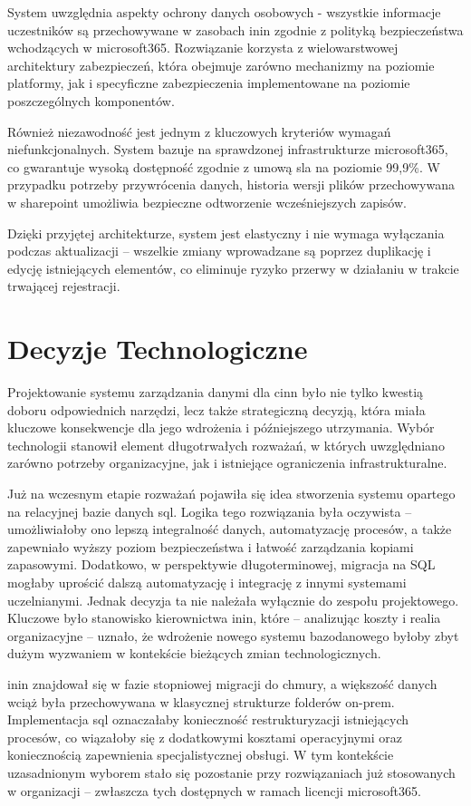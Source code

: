 System uwzględnia aspekty ochrony danych osobowych - wszystkie informacje uczestników są przechowywane w zasobach \gls{inin} zgodnie z polityką bezpieczeństwa wchodzących w \gls{microsoft365}. Rozwiązanie korzysta z wielowarstwowej architektury zabezpieczeń, która obejmuje zarówno mechanizmy na poziomie platformy, jak i specyficzne zabezpieczenia implementowane na poziomie poszczególnych komponentów. 

Również niezawodność jest jednym z kluczowych kryteriów wymagań niefunkcjonalnych. System bazuje na sprawdzonej infrastrukturze \gls{microsoft365}, co gwarantuje wysoką dostępność zgodnie z umową \gls{sla} na poziomie 99,9\%. W przypadku potrzeby przywrócenia danych, historia wersji plików przechowywana w \gls{sharepoint} umożliwia bezpieczne odtworzenie wcześniejszych zapisów. 

Dzięki przyjętej architekturze, system jest elastyczny i nie wymaga wyłączania podczas aktualizacji – wszelkie zmiany wprowadzane są poprzez duplikację i edycję istniejących elementów, co eliminuje ryzyko przerwy w działaniu w trakcie trwającej rejestracji. 

\section{Decyzje Technologiczne}
Projektowanie systemu zarządzania danymi dla \gls{cinn} było nie tylko kwestią doboru odpowiednich narzędzi, lecz także strategiczną decyzją, która miała kluczowe konsekwencje dla jego wdrożenia i późniejszego utrzymania. Wybór technologii stanowił element długotrwałych rozważań, w których uwzględniano zarówno potrzeby organizacyjne, jak i istniejące ograniczenia infrastrukturalne.

Już na wczesnym etapie rozważań pojawiła się idea stworzenia systemu opartego na relacyjnej bazie danych \gls{sql}. Logika tego rozwiązania była oczywista – umożliwiałoby ono lepszą integralność danych, automatyzację procesów, a także zapewniało wyższy poziom bezpieczeństwa i łatwość zarządzania kopiami zapasowymi. Dodatkowo, w perspektywie długoterminowej, migracja na SQL mogłaby uprościć dalszą automatyzację i integrację z innymi systemami uczelnianymi. Jednak decyzja ta nie należała wyłącznie do zespołu projektowego. Kluczowe było stanowisko kierownictwa \gls{inin}, które – analizując koszty i realia organizacyjne – uznało, że wdrożenie nowego systemu bazodanowego byłoby zbyt dużym wyzwaniem w kontekście bieżących zmian technologicznych.

\gls{inin} znajdował się w fazie stopniowej migracji do chmury, a większość danych wciąż była przechowywana w klasycznej strukturze folderów on-prem. Implementacja \gls{sql} oznaczałaby konieczność restrukturyzacji istniejących procesów, co wiązałoby się z dodatkowymi kosztami operacyjnymi oraz koniecznością zapewnienia specjalistycznej obsługi. W tym kontekście uzasadnionym wyborem stało się pozostanie przy rozwiązaniach już stosowanych w organizacji – zwłaszcza tych dostępnych w ramach licencji \gls{microsoft365}.

